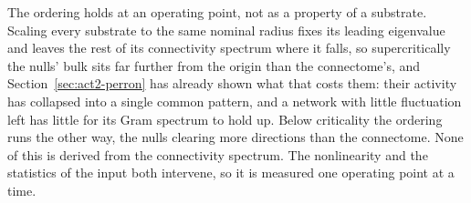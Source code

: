The ordering holds at an operating point, not as a property of a substrate. Scaling every
substrate to the same nominal radius fixes its leading eigenvalue and leaves the
rest of its connectivity spectrum where it falls, so supercritically the nulls'
bulk sits far further from the origin than the connectome's, and
Section~\ref{sec:act2-perron} has already shown what that costs them: their
activity has collapsed into a single common pattern, and a network with little
fluctuation left has little for its Gram spectrum to hold up. Below criticality
the ordering runs the other way, the nulls clearing more directions than the
connectome. %
None of this is derived from the connectivity spectrum. The nonlinearity and the
statistics of the input both intervene, so it is measured one operating point at
a time.

